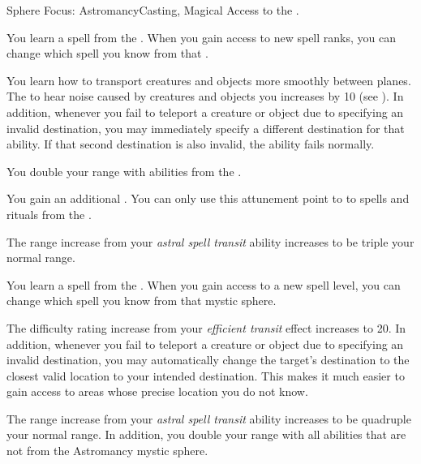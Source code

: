     \begin{feat}{Sphere Focus: Astromancy}{Casting, Magical}
        \featpre Access to the  .

         You learn a spell from the  .
        When you gain access to new spell ranks, you can change which spell you know from that .

         You learn how to transport creatures and objects more smoothly between planes.
        The  to hear noise caused by creatures and objects you  increases by 10 (see ).
        In addition, whenever you fail to teleport a creature or object due to specifying an invalid destination, you may immediately specify a different destination for that ability.
        If that second destination is also invalid, the ability fails normally.

         You double your range with abilities from the  .

         You gain an additional .
        You can only use this attunement point to  to spells and rituals from the  .

         The range increase from your \textit{astral spell transit} ability increases to be triple your normal range.

         You learn a spell from the  .
        When you gain access to a new spell level, you can change which spell you know from that mystic sphere.

         The difficulty rating increase from your \textit{efficient transit} effect increases to 20.
        In addition, whenever you fail to teleport a creature or object due to specifying an invalid destination, you may automatically change the target's destination to the closest valid location to your intended destination.
        This makes it much easier to gain access to areas whose precise location you do not know.

         The range increase from your \textit{astral spell transit} ability increases to be quadruple your normal range.
        In addition, you double your range with all  abilities that are not from the Astromancy mystic sphere.
    \end{feat}

